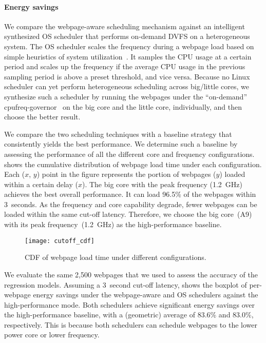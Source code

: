 \paragraph{Energy savings} We compare the webpage-aware scheduling mechanism against an intelligent synthesized OS scheduler that performs on-demand DVFS on a heterogeneous system. The OS scheduler scales the frequency during a webpage load based on simple heuristics of system utilization~\cite{OS_DVFS1,OS_DVFS2}. It samples the CPU usage at a certain period and scales up the frequency if the average CPU usage in the previous sampling period is above a preset threshold, and vice versa. Because no Linux scheduler can yet perform heterogeneous scheduling across big/little cores, we synthesize such a scheduler by running the webpages under the ``on-demand'' cpufreq-governor~\cite{ondemand} on the big core and the little core, individually, and then choose the better result.

We compare the two scheduling techniques with a baseline strategy that consistently yields the best performance. We determine such a baseline by assessing the performance of all the different core and frequency configurations.  shows the cumulative distribution of webpage load time under each configuration. Each ($x$, $y$) point in the figure represents the portion of webpages ($y$) loaded within a certain delay ($x$). The big core with the peak frequency (1.2~GHz) achieves the best overall performance. It can load 96.5\% of the webpages within 3~seconds. As the frequency and core capability degrade, fewer webpages can be loaded within the same cut-off latency. Therefore, we choose the big core~(A9) with its peak frequency~(1.2~GHz) as the high-performance baseline.

\begin{figure}[t]
\centering
\texttt{[image: cutoff\_cdf]}
\caption{\small{CDF of webpage load time under different configurations.}}
\label{fig:cutoff_cdf}
\end{figure}

We evaluate the same 2,500 webpages that we used to assess the accuracy of the regression models. Assuming a 3~second cut-off latency,  shows the boxplot of per-webpage energy savings under the webpage-aware and OS schedulers against the high-performance mode. Both schedulers achieve significant energy savings over the high-performance baseline, with a (geometric) average of 83.6\% and 83.0\%, respectively. This is because both schedulers can schedule webpages to the lower power core or lower frequency.

